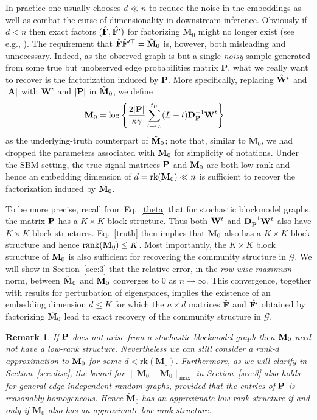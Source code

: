 \documentclass[10pt,journal,compsoc]{IEEEtran}
\newcommand{\ee}{\end{aligned} \end{equation}}
\newtheorem{remark}{Remark}
\newcommand{\bee}{\begin{equation}\begin{aligned}}
\newcommand{\M}[1]{{{\mathbf{\MakeUppercase{#1}}}}}
\numberwithin{equation}{section}
\begin{document}
{In practice one usually chooses $d \ll n$ to reduce the noise in the embeddings as well as combat the curse of dimensionality in downstream inference. Obviously if $d < n$ then
exact factors $(\hat{\M F}, \hat{\M
  F'})$ for factorizing
$\tilde{\mathbf{M}}_0$ might no longer exist (see e.g., \cite{levy2014neural}). The requirement that $\hat{\M F} \hat{\M F}'^{\top} = \tilde{\mathbf{M}}_0$ is, however, both misleading and unnecessary. Indeed,
as the observed graph is but a single {\em noisy}
sample generated from some true but unobserved edge probabilities matrix
$\mathbf{P}$, what we really want to recover is the factorization induced by $\mathbf{P}$. More specifically, replacing $\hat{\M W}^t$ and $|\M A|$ with ${\M W}^t$ and $|\M P|$ in $\tilde{\M M}_0$, we define
\bee\label{truth}
\M M_0
&= \log\Bigg\{\frac{2|\M P|}{\kappa \gamma}\sum_{t = t_L}^{t_U}(L - t)\M D_{\M P}^{-1}{\M W}^t\Bigg\} 
\ee
as the underlying-truth counterpart of $\tilde{\M M}_0$; %
note that, similar to $\tilde{\mathbf{M}}_0$, we had dropped the parameters associated with $\M M_0$ for simplicity of notations. Under the  SBM setting, the true signal matrices $\M P$ and $\M M_0$ are both low-rank and hence an embedding dimension of $d = \text{rk}(\M M_0) \ll n$ is sufficient to recover the factorization induced by $\M M_0$. 
  
  To be more precise, recall from Eq.~\eqref{theta} that for stochastic blockmodel graphs, the matrix $\M P$ has a $K\times K$
block structure. Thus both $\M W^{t}$ and  $\M D_{\M P}^{-1}\M W^t$ also have $K \times
K$ block structures. Eq.~\eqref{truth} then implies that $\M M_0$  also
has a $K \times K$ block structure and hence $\mathrm{rank}(\M M_0)
\leq K$. Most importantly, the $K \times K$ block structure of ${\M M}_0$
is also sufficient for recovering the community structure in
$\mathcal{G}$. {\color{black}
We will show in Section~\ref{sec:3} that the relative
error, in the \textit{row-wise maximum} norm, between
$\tilde{\M M}_0$ and ${\M M}_0$ converges to $0$ as
$n\rightarrow \infty$. This convergence, together with results for perturbation of eigenspaces, implies the existence of an embedding
dimension $d \leq K$ for which the $n \times d$ matrices $\hat{\M F}$
and $\hat{\M F'}$ obtained by factorizing $\tilde{\M M}_0$  lead to exact recovery of the community
structure in $\mathcal{G}$. }
}

\begin{remark}
{\upshape
If $\M P$ does
not arise from a stochastic blockmodel graph then ${\M M}_0$ need not
have a low-rank structure. Nevertheless we can still consider a
rank-$d$ approximation to ${\M M}_0$ for some $d <
\mathrm{rk}(\mathbf{M}_0)$. Furthermore, as we will clarify in
Section~\ref{sec:disc}, the bound for
$\|\tilde{\mathbf{M}}_0 - \mathbf{M}_0\|_{\max}$ in Section~\ref{sec:3}
also holds for general edge independent random graphs, provided that
the entries of $\M P$ is reasonably homogeneous. Hence $\tilde{\mathbf{M}}_0$ has an approximate low-rank
structure if and only if $\mathbf{M}_0$ also has an approximate low-rank
structure.
}
\end{remark}
\end{document}
